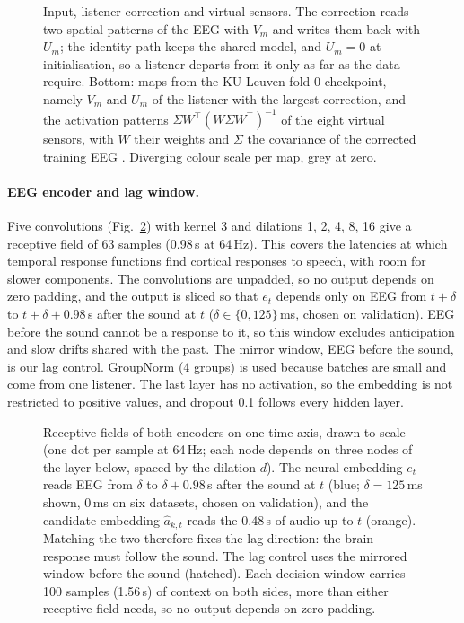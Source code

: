 \documentclass[10pt,twocolumn,letterpaper]{article}
\begin{document}
\begin{figure}[t]\centering
\resizebox{\textwidth}{!}{}
\caption{Input, listener correction and virtual sensors. The correction reads two spatial
patterns of the EEG with $V_m$ and writes them back with $U_m$; the identity path
keeps the shared model, and $U_m=0$ at initialisation, so a listener departs from it only
as far as the data require. Bottom: maps from the KU Leuven fold-0 checkpoint, namely
$V_m$ and $U_m$ of the listener with the largest correction, and the activation
patterns $\Sigma W^{\top}(W\Sigma W^{\top})^{-1}$ of the eight virtual sensors, with $W$ their
weights and $\Sigma$ the covariance
of the corrected training EEG \citep{haufe2014interpretation}. Diverging colour scale per
map, grey at zero.}\label{fig:net_input}
\end{figure}

\paragraph{EEG encoder and lag window.} Five convolutions (Fig.~\ref{fig:net_enc}) with kernel 3 and dilations
1, 2, 4, 8, 16 give a receptive field of 63 samples (0.98\,s at 64\,Hz). This covers the
latencies at which temporal response functions find cortical responses to speech, with
room for slower components. The
convolutions are unpadded, so no output depends on zero padding, and the output is sliced
so that $e_t$ depends only on EEG from $t+\delta$ to $t+\delta+0.98$\,s after the
sound at $t$ ($\delta\in\{0,125\}$\,ms, chosen on validation). EEG before the sound cannot
be a response to it, so this window excludes anticipation and slow drifts shared with the
past. The mirror window, EEG before the sound, is our lag control. GroupNorm (4 groups)
is used because batches are small and come from one listener. The last layer has no
activation, so the embedding is not restricted to positive values, and dropout 0.1
follows every hidden layer.

\begin{figure}[t]\centering
\resizebox{0.95\textwidth}{!}{}
\caption{Receptive fields of both encoders on one time axis, drawn to scale (one dot per
sample at 64\,Hz; each node depends on three nodes of the layer below, spaced by the
dilation $d$). The neural embedding $e_t$ reads EEG from $\delta$ to
$\delta+0.98$\,s after the sound at $t$ (blue; $\delta=125$\,ms shown, 0\,ms on six
datasets, chosen on validation), and the candidate embedding $\hat a_{k,t}$ reads the
0.48\,s of audio up to $t$ (orange). Matching the two therefore fixes the lag direction:
the brain response must follow the sound. The lag control uses the mirrored window before
the sound (hatched). Each decision window carries 100 samples (1.56\,s) of context on both
sides, more than either receptive field needs, so no output depends on zero
padding.}\label{fig:net_enc}
\end{figure}
\end{document}
